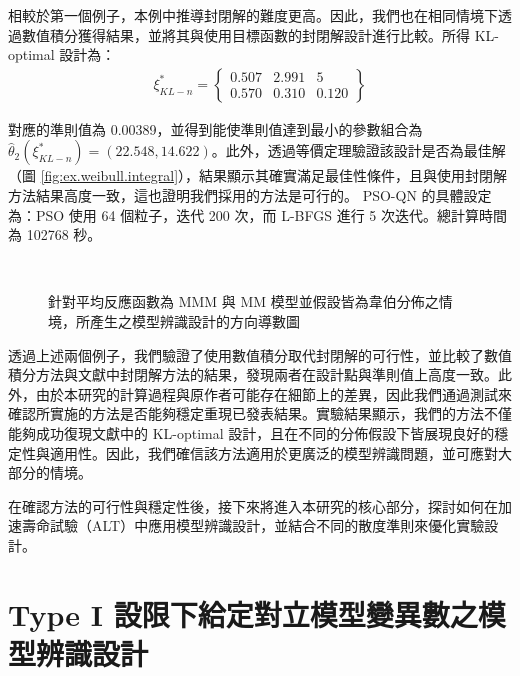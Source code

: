\hspace*{8mm} 相較於第一個例子，本例中推導封閉解的難度更高。因此，我們也在相同情境下透過數值積分獲得結果，並將其與使用目標函數的封閉解設計進行比較。所得 KL-optimal 設計為：
\begin{align*}
\xi^*_{KL-n} = \left\{\begin{array}{ccc}
0.507 & 2.991 & 5 \\
0.570 & 0.310 & 0.120
\end{array}\right\}
\end{align*}

\hspace*{8mm} 對應的準則值為 0.00389，並得到能使準則值達到最小的參數組合為 $\hat{\theta}_2(\xi^*_{KL-n})=(22.548, 14.622)$。此外，透過等價定理驗證該設計是否為最佳解（圖 \ref{fig:ex.weibull.integral}），結果顯示其確實滿足最佳性條件，且與使用封閉解方法結果高度一致，這也證明我們採用的方法是可行的。 PSO-QN 的具體設定為：PSO 使用 64 個粒子，迭代 200 次，而 L-BFGS 進行 5 次迭代。總計算時間為 102768 秒。

\begin{figure}[H]
\centering
{}
 \\
\caption{針對平均反應函數為 MMM 與 MM 模型並假設皆為韋伯分佈之情境，所產生之模型辨識設計的方向導數圖}
\label{fig:Fidalgo-weibull}
\end{figure}

\hspace*{8mm} 透過上述兩個例子，我們驗證了使用數值積分取代封閉解的可行性，並比較了數值積分方法與文獻中封閉解方法的結果，發現兩者在設計點與準則值上高度一致。此外，由於本研究的計算過程與原作者可能存在細節上的差異，因此我們通過測試來確認所實施的方法是否能夠穩定重現已發表結果。實驗結果顯示，我們的方法不僅能夠成功復現文獻中的 KL-optimal 設計，且在不同的分佈假設下皆展現良好的穩定性與適用性。因此，我們確信該方法適用於更廣泛的模型辨識問題，並可應對大部分的情境。  

\hspace*{8mm} 在確認方法的可行性與穩定性後，接下來將進入本研究的核心部分，探討如何在加速壽命試驗（ALT）中應用模型辨識設計，並結合不同的散度準則來優化實驗設計。

\section{Type I 設限下給定對立模型變異數之模型辨識設計}\label{SEC:DeviceA-fixed variance}

